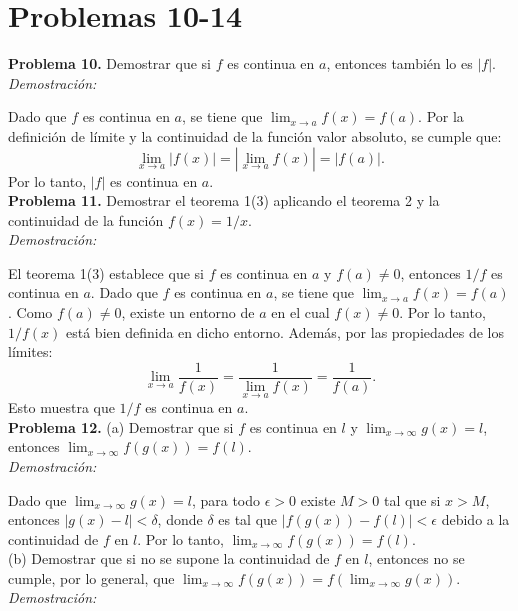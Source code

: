 \section*{Problemas 10-14}

\textbf{Problema 10.} Demostrar que si $f$ es continua en $a$, entonces también lo es $|f|$.\\

\textit{Demostración:}

Dado que $f$ es continua en $a$, se tiene que $\lim_{x \to a} f(x) = f(a)$. Por la definición de límite y la continuidad de la función valor absoluto, se cumple que:
\[
\lim_{x \to a} |f(x)| = |\lim_{x \to a} f(x)| = |f(a)|.
\]
Por lo tanto, $|f|$ es continua en $a$.\\

\textbf{Problema 11.} Demostrar el teorema 1(3) aplicando el teorema 2 y la continuidad de la función $f(x) = 1/x$.\\

\textit{Demostración:}

El teorema 1(3) establece que si $f$ es continua en $a$ y $f(a) \neq 0$, entonces $1/f$ es continua en $a$. Dado que $f$ es continua en $a$, se tiene que $\lim_{x \to a} f(x) = f(a)$. Como $f(a) \neq 0$, existe un entorno de $a$ en el cual $f(x) \neq 0$. Por lo tanto, $1/f(x)$ está bien definida en dicho entorno. Además, por las propiedades de los límites:
\[
\lim_{x \to a} \frac{1}{f(x)} = \frac{1}{\lim_{x \to a} f(x)} = \frac{1}{f(a)}.
\]
Esto muestra que $1/f$ es continua en $a$.\\

\textbf{Problema 12.} (a) Demostrar que si $f$ es continua en $l$ y $\lim_{x \to \infty} g(x) = l$, entonces $\lim_{x \to \infty} f(g(x)) = f(l)$.\\

\textit{Demostración:}

Dado que $\lim_{x \to \infty} g(x) = l$, para todo $\epsilon > 0$ existe $M > 0$ tal que si $x > M$, entonces $|g(x) - l| < \delta$, donde $\delta$ es tal que $|f(g(x)) - f(l)| < \epsilon$ debido a la continuidad de $f$ en $l$. Por lo tanto, $\lim_{x \to \infty} f(g(x)) = f(l)$.\\

(b) Demostrar que si no se supone la continuidad de $f$ en $l$, entonces no se cumple, por lo general, que $\lim_{x \to \infty} f(g(x)) = f(\lim_{x \to \infty} g(x))$.\\

\textit{Demostración:}

